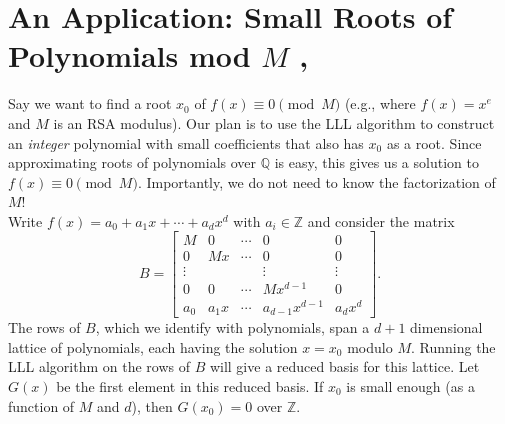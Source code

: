 \documentclass[11pt,letterpaper]{article}
\newcommand{\integers}{\mathbb{Z}}
\newcommand{\rationals}{\mathbb{Q}}
\theoremstyle{definition}
\begin{document}

\section*{An Application: Small Roots of Polynomials mod $M$ \cite{coppersmith96}, \cite{galbraith18}}
Say we want to find a root $x_0$ of $f(x) \equiv 0 \pmod{M}$ (e.g., where $f(x) = x^e$ and $M$ is an RSA modulus). Our plan is to use the LLL algorithm to construct an \textit{integer} polynomial with small coefficients that also has $x_0$ as a root. Since approximating roots of polynomials over $\rationals$ is easy, this gives us a solution to $f(x)\equiv 0 \pmod{M}$. Importantly, we do not need to know the factorization of $M$!\\
\noindent Write $f(x) = a_0 + a_1x+\cdots + a_dx^d$ with $a_i\in \integers$ and consider the matrix 
\[
B = \begin{bmatrix}
	M & 0 & \cdots & 0 & 0\\
	0 & Mx & \cdots & 0 & 0\\
	\vdots &  && \vdots & \vdots\\
	0 & 0 & \cdots & Mx^{d-1} & 0\\
	a_0 & a_1x & \cdots & a_{d-1}x^{d-1} & a_dx^d
\end{bmatrix}.
\]
The rows of $B$, which we identify with polynomials, span a $d+1$ dimensional lattice of polynomials, each having the solution $x=x_0$ modulo $M$. Running the LLL algorithm on the rows of $B$ will give a reduced basis for this lattice. Let $G(x)$ be the first element in this reduced basis. If $x_0$ is small enough (as a function of $M$ and $d$), then $G(x_0) = 0$ over $\integers$.

\printbibliography
\end{document}
